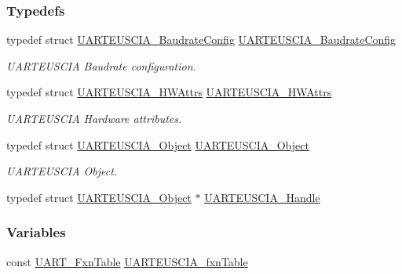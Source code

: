 \subsubsection*{Typedefs}
\begin{DoxyCompactItemize}
\item 
typedef struct \hyperlink{struct_u_a_r_t_e_u_s_c_i_a___baudrate_config}{U\+A\+R\+T\+E\+U\+S\+C\+I\+A\+\_\+\+Baudrate\+Config} \hyperlink{_u_a_r_t_e_u_s_c_i_a_8h_a2ab5c8b4f9b1bd5b375db37c1fc697e7}{U\+A\+R\+T\+E\+U\+S\+C\+I\+A\+\_\+\+Baudrate\+Config}
\begin{DoxyCompactList}\small\item\em U\+A\+R\+T\+E\+U\+S\+C\+I\+A Baudrate configuration. \end{DoxyCompactList}\item 
typedef struct \hyperlink{struct_u_a_r_t_e_u_s_c_i_a___h_w_attrs}{U\+A\+R\+T\+E\+U\+S\+C\+I\+A\+\_\+\+H\+W\+Attrs} \hyperlink{_u_a_r_t_e_u_s_c_i_a_8h_ac2776f64ec5846ca87b5ddcd052b551e}{U\+A\+R\+T\+E\+U\+S\+C\+I\+A\+\_\+\+H\+W\+Attrs}
\begin{DoxyCompactList}\small\item\em U\+A\+R\+T\+E\+U\+S\+C\+I\+A Hardware attributes. \end{DoxyCompactList}\item 
typedef struct \hyperlink{struct_u_a_r_t_e_u_s_c_i_a___object}{U\+A\+R\+T\+E\+U\+S\+C\+I\+A\+\_\+\+Object} \hyperlink{_u_a_r_t_e_u_s_c_i_a_8h_ace543e3e62c1500d7a6f1c2b96c139d1}{U\+A\+R\+T\+E\+U\+S\+C\+I\+A\+\_\+\+Object}
\begin{DoxyCompactList}\small\item\em U\+A\+R\+T\+E\+U\+S\+C\+I\+A Object. \end{DoxyCompactList}\item 
typedef struct \hyperlink{struct_u_a_r_t_e_u_s_c_i_a___object}{U\+A\+R\+T\+E\+U\+S\+C\+I\+A\+\_\+\+Object} $\ast$ \hyperlink{_u_a_r_t_e_u_s_c_i_a_8h_a175c740859abb56b7cb21810ce5a5ee3}{U\+A\+R\+T\+E\+U\+S\+C\+I\+A\+\_\+\+Handle}
\end{DoxyCompactItemize}
\subsubsection*{Variables}
\begin{DoxyCompactItemize}
\item 
const \hyperlink{struct_u_a_r_t___fxn_table}{U\+A\+R\+T\+\_\+\+Fxn\+Table} \hyperlink{_u_a_r_t_e_u_s_c_i_a_8h_a5dcb2ca228f03ca22a5f859e35b8f8da}{U\+A\+R\+T\+E\+U\+S\+C\+I\+A\+\_\+fxn\+Table}
\end{DoxyCompactItemize}


